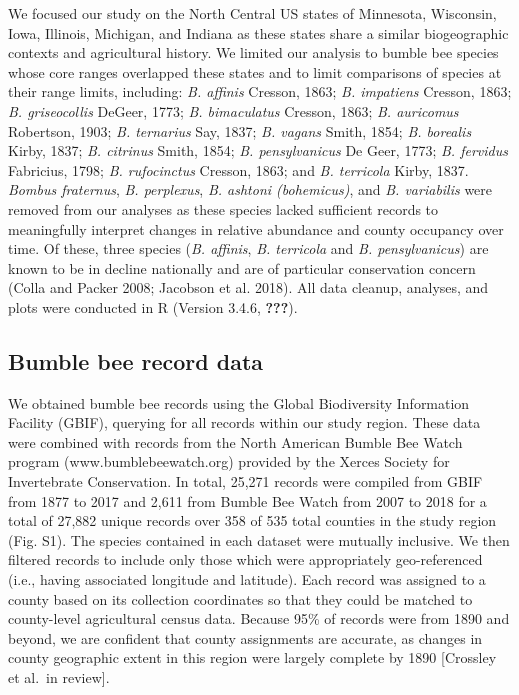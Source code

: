 \documentclass[11pt,]{article}
\begin{document}
We focused our study on the North Central US states of Minnesota,
Wisconsin, Iowa, Illinois, Michigan, and Indiana as these states share a
similar biogeographic contexts and agricultural history. We limited our
analysis to bumble bee species whose core ranges overlapped these states
and to limit comparisons of species at their range limits, including:
\emph{B. affinis} Cresson, 1863; \emph{B. impatiens} Cresson, 1863;
\emph{B. griseocollis} DeGeer, 1773; \emph{B. bimaculatus} Cresson,
1863; \emph{B. auricomus} Robertson, 1903; \emph{B. ternarius} Say,
1837; \emph{B. vagans} Smith, 1854; \emph{B. borealis} Kirby, 1837;
\emph{B. citrinus} Smith, 1854; \emph{B. pensylvanicus} De Geer, 1773;
\emph{B. fervidus} Fabricius, 1798; \emph{B. rufocinctus} Cresson, 1863;
and \emph{B. terricola} Kirby, 1837. \emph{Bombus fraternus}, \emph{B.
perplexus}, \emph{B. ashtoni (bohemicus)}, and \emph{B. variabilis} were
removed from our analyses as these species lacked sufficient records to
meaningfully interpret changes in relative abundance and county
occupancy over time. Of these, three species (\emph{B. affinis},
\emph{B. terricola} and \emph{B. pensylvanicus}) are known to be in
decline nationally and are of particular conservation concern (Colla and
Packer 2008; Jacobson et al. 2018). All data cleanup, analyses, and
plots were conducted in R (Version 3.4.6, {\textbf{???}}).

\hypertarget{bumble-bee-record-data}{%
\subsection{Bumble bee record data}\label{bumble-bee-record-data}}

We obtained bumble bee records using the Global Biodiversity Information
Facility (GBIF), querying for all records within our study region. These
data were combined with records from the North American Bumble Bee Watch
program (www.bumblebeewatch.org) provided by the Xerces Society for
Invertebrate Conservation. In total, 25,271 records were compiled from
GBIF from 1877 to 2017 and 2,611 from Bumble Bee Watch from 2007 to 2018
for a total of 27,882 unique records over 358 of 535 total counties in
the study region (Fig. S1). The species contained in each dataset were
mutually inclusive. We then filtered records to include only those which
were appropriately geo-referenced (i.e., having associated longitude and
latitude). Each record was assigned to a county based on its collection
coordinates so that they could be matched to county-level agricultural
census data. Because 95\% of records were from 1890 and beyond, we are
confident that county assignments are accurate, as changes in county
geographic extent in this region were largely complete by 1890
{[}Crossley et al.~in review{]}.
\end{document}
